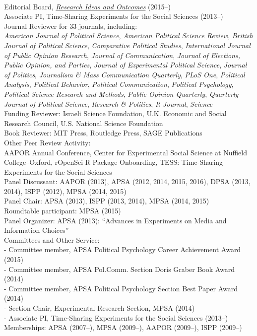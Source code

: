 \documentclass[12pt]{article}
\newcommand{\topic}[1]{\pagebreak[3]\indent {\color{lg}{\footnotesize #1 }}\\}
\newcommand{\entry}[1]{\indent {\color{lg}\guillemotright}\hspace{2pt}#1\vspace{.25em}\\}
\newcommand{\subentry}[1]{{\color{lg}-} #1\vspace{.25em}\\}
\begin{document}
\topic{Disciplinary}
	\entry{Editorial Board, \href{http://riojournal.com/}{{\em Research Ideas and Outcomes}} (2015--)}
	\entry{Associate PI, Time-Sharing Experiments for the Social Sciences (2013--)}
	\entry{Journal Reviewer for 33 journals, including:\\\textit{American Journal of Political Science}, \textit{American Political Science Review}, \textit{British Journal of Political Science}, \textit{Comparative Political Studies}, \textit{International Journal of Public Opinion Research}, \textit{Journal of Communication}, \textit{Journal of Elections, Public Opinion, and Parties}, \textit{Journal of Experimental Political Science}, \textit{Journal of Politics}, \textit{Journalism \& Mass Communication Quarterly}, \textit{PLoS One}, \textit{Political Analysis}, \textit{Political Behavior}, \textit{Political Communication}, \textit{Political Psychology}, \textit{Political Science Research and Methods}, \textit{Public Opinion Quarterly}, \textit{Quarterly Journal of Political Science}, \textit{Research \& Politics}, \textit{R Journal}, \textit{Science}}
	\entry{Funding Reviewer: Israeli Science Foundation, U.K. Economic and Social Research Council, U.S. National Science Foundation}
	\entry{Book Reviewer: MIT Press, Routledge Press, SAGE Publications}
	\entry{Other Peer Review Activity:\\ AAPOR Annual Conference, Center for Experimental Social Science at Nuffield College--Oxford, rOpenSci R Package Onboarding, TESS: Time-Sharing Experiments for the Social Sciences}
	\entry{Panel Discussant: AAPOR (2013), APSA (2012, 2014, 2015, 2016), DPSA (2013, 2014), ISPP (2012), MPSA (2014, 2015)}
	\entry{Panel Chair: APSA (2013), ISPP (2013, 2014), MPSA (2014, 2015)}
	\entry{Roundtable participant: MPSA (2015)}
	\entry{Panel Organizer: APSA (2013): ``Advances in Experiments on Media and Information Choices''}
	\entry{Committees and Other Service:}
	\subentry{Committee member, APSA Political Psychology Career Achievement Award (2015)}
	\subentry{Committee member, APSA Pol.Comm. Section Doris Graber Book Award (2014)}
	\subentry{Committee member, APSA Political Psychology Section Best Paper Award (2014)}
	\subentry{Section Chair, Experimental Research Section, MPSA (2014)}
	\subentry{Associate PI, Time-Sharing Experiments for the Social Sciences (2013--)}
	\entry{Memberships: APSA (2007--), MPSA (2009--), AAPOR (2009--), ISPP (2009--)}
\end{document}
